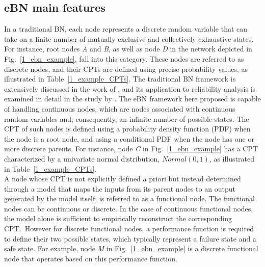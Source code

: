 \subsection{eBN main features}
In a traditional BN, each node represents a discrete random variable that can take on a finite number of mutually exclusive and collectively exhaustive states.
For instance, root nodes \textit{A} and  \textit{B}, as well as node \textit{D} in the network depicted in Fig.~\ref{1_ebn_example}, fall into this category.
These nodes are referred to as discrete nodes, and their CPTs are defined using precise probability values, as illustrated in Table~\ref{1_example_CPTs}.
The traditional BN framework is extensively discussed in the work of \textcite{russell_computer}, and its application to reliability analysis is examined in detail in the study by \textcite{langseth_bayesian_2007}.
The eBN framework here proposed is capable of handling continuous nodes, which are nodes associated with continuous random variables and, consequently, an infinite number of possible states.
The CPT of such nodes is defined using a probability density function (PDF) when the node is a root node, and using a conditional PDF when the node has one or more discrete parents.
For instance, node \textit{C} in Fig.~\ref{1_ebn_example} has a CPT characterized by a univariate normal distribution, $Normal(0,1)$, as illustrated in Table~\ref{1_example_CPTs}. \\  
A node whose CPT is not explicitly defined a priori but instead determined through a model that maps the inputs from its parent nodes to an output generated by the model itself, is referred to as a functional node.
The functional nodes can be continuous or discrete. 
In the case of continuous functional nodes, the model alone is sufficient to empirically reconstruct the corresponding CPT.\ 
However for discrete functional nodes, a performance function is required to define their two possible states, which typically represent a failure state and a safe state.
For example, node \textit{M} in Fig.~\ref{1_ebn_example} is a discrete functional node that operates based on this performance function. \\

